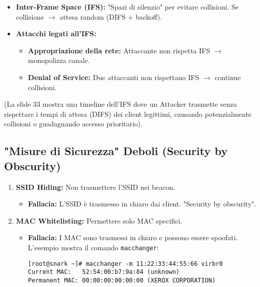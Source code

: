 \documentclass{article}
\begin{document}
\begin{itemize}
    \item \textbf{Inter-Frame Space (IFS):} "Spazi di silenzio" per evitare collisioni.
    Se collisione $\rightarrow$ attesa random (DIFS + backoff).
    \item \textbf{Attacchi legati all'IFS:}
    \begin{itemize}
        \item \textbf{Appropriazione della rete:} Attaccante non rispetta IFS $\rightarrow$ monopolizza canale.
        \item \textbf{Denial of Service:} Due attaccanti non rispettano IFS $\rightarrow$ continue collisioni.
    \end{itemize}
\end{itemize}
(La slide 33 mostra una timeline dell'IFS dove un Attacker trasmette senza rispettare i tempi di attesa (DIFS) dei client legittimi, causando potenzialmente collisioni o guadagnando accesso prioritario).

\subsection{"Misure di Sicurezza" Deboli (Security by Obscurity)}
\begin{enumerate}
    \item \textbf{SSID Hiding:} Non trasmettere l'SSID nei beacon.
    \begin{itemize}
        \item \textbf{Fallacia:} L'SSID è trasmesso in chiaro dai client. "Security by obscurity".
    \end{itemize}
    \item \textbf{MAC Whitelisting:} Permettere solo MAC specifici.
    \begin{itemize}
        \item \textbf{Fallacia:} I MAC sono trasmessi in chiaro e possono essere spoofati.
        L'esempio mostra il comando \texttt{macchanger}:
\begin{verbatim}
[root@snark ~]# macchanger -m 11:22:33:44:55:66 virbr0
Current MAC:   52:54:00:b7:9a:84 (unknown)
Permanent MAC: 00:00:00:00:00:00 (XEROX CORPORATION)
\end{verbatim}
    \end{itemize}
\end{enumerate}
\end{document}
